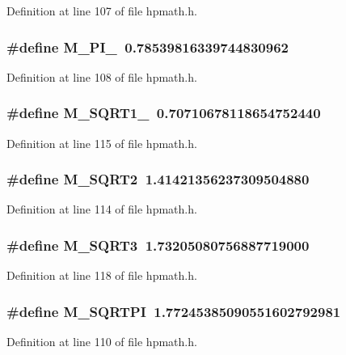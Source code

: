 Definition at line 107 of file hpmath.h.
\subsubsection{\setlength{\rightskip}{0pt plus 5cm}\#define M\_\-PI\_\ 0.78539816339744830962}\label{hpmath_8h_a18}




Definition at line 108 of file hpmath.h.
\subsubsection{\setlength{\rightskip}{0pt plus 5cm}\#define M\_\-SQRT1\_\ 0.70710678118654752440}\label{hpmath_8h_a25}




Definition at line 115 of file hpmath.h.
\subsubsection{\setlength{\rightskip}{0pt plus 5cm}\#define M\_\-SQRT2\ 1.41421356237309504880}\label{hpmath_8h_a24}




Definition at line 114 of file hpmath.h.
\subsubsection{\setlength{\rightskip}{0pt plus 5cm}\#define M\_\-SQRT3\ 1.73205080756887719000}\label{hpmath_8h_a28}




Definition at line 118 of file hpmath.h.
\subsubsection{\setlength{\rightskip}{0pt plus 5cm}\#define M\_\-SQRTPI\ 1.77245385090551602792981}\label{hpmath_8h_a20}




Definition at line 110 of file hpmath.h.

